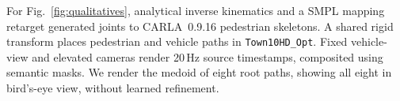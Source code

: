 For Fig.~\ref{fig:qualitatives}, analytical inverse kinematics and a SMPL mapping
retarget generated joints to CARLA~0.9.16 pedestrian skeletons. A shared rigid
transform places pedestrian and vehicle paths in \texttt{Town10HD\_Opt}.
Fixed vehicle-view and elevated cameras render 20\,Hz source timestamps,
composited using semantic masks. We render the medoid of eight root paths,
showing all eight in bird's-eye view, without learned refinement.
